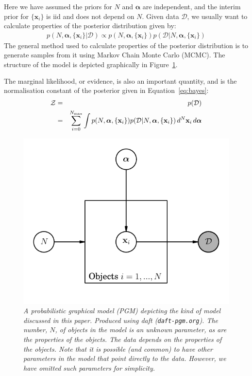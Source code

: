 \documentclass[letterpaper, 11pt]{article}
\newcommand{\hyperparams}{\boldsymbol{\alpha}}
\newcommand{\xx}{\mathbf{x}}
\begin{document}
Here we have assumed the priors for $N$ and $\hyperparams$ are independent, and
the interim prior for $\{\xx_i\}$ is iid and does not depend on $N$.
Given data $\mathcal{D}$, we usually want to calculate properties of the
posterior distribution given by:
\begin{eqnarray}
p(N, \hyperparams, \{\xx_i\} | \mathcal{D}) \propto
p(N, \hyperparams, \{\xx_i\})
p(\mathcal{D} | N, \hyperparams, \{\xx_i\})\label{eq:bayes}
\end{eqnarray}
The general method used to calculate properties of the posterior distribution
is to generate samples from it using Markov Chain Monte Carlo (MCMC). The
structure of the model is depicted graphically in Figure~\ref{fig:pgm}.

The marginal likelihood, or evidence, is also an important quantity, and is
the normalisation constant of the posterior given in Equation~\ref{eq:bayes}:
\begin{eqnarray}
\mathcal{Z} &=& p(\mathcal{D})\\
&=& \sum_{i=0}^{N_{\rm max}} \int
p(N, \hyperparams, \{\xx_i\})p(\mathcal{D} | N, \hyperparams, \{\xx_i\})
\, d^N \xx_i \, d\hyperparams \label{eq:evidence}
\end{eqnarray}


\begin{figure}
\begin{center}
\includegraphics{pgm.pdf}
\caption{\it A probabilistic graphical model (PGM) depicting the kind
of model discussed in this paper. Produced using daft ({\tt daft-pgm.org}).
The number, $N$, of objects in the model is an unknown parameter, as are the
properties of the objects. The data depends on the properties of the objects.
Note that it is possible (and common) to have other parameters in the model
that point directly to the data. However, we have omitted such parameters
for simplicity.
\label{fig:pgm}}
\end{center}
\end{figure}
\end{document}

